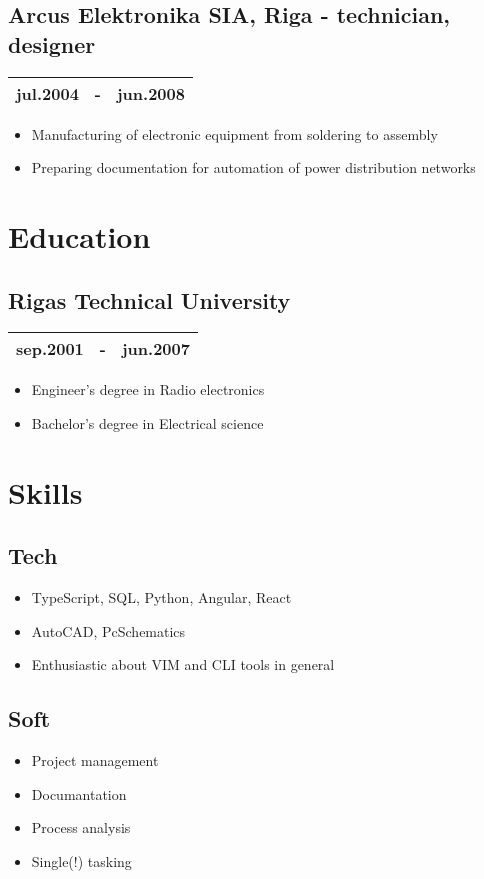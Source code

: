 \documentclass[10pt]{article}
\begin{document}
\begin{multicols*}{2}
\subsection*{Arcus Elektronika SIA, \textmd{Riga} - \textmd{technician, designer}}
\begin{tabular}{lll}
    jul.2004 & - & jun.2008\\
    \hline
\end{tabular}
\begin{itemize}
    \item Manufacturing of electronic equipment from soldering to assembly
    \item Preparing documentation for automation of power distribution networks
\end{itemize}
\section*{Education}
\subsection*{Rigas Technical University}
\begin{tabular}{lll}
    sep.2001 & - & jun.2007\\
    \hline
\end{tabular}
\begin{itemize}
    \item Engineer's degree in Radio electronics
    \item Bachelor's degree in Electrical science
\end{itemize}
\section*{Skills}
\subsection*{Tech}
\begin{itemize}
    \item TypeScript, SQL, Python, Angular, React
    \item AutoCAD, PcSchematics
    \item Enthusiastic about VIM and CLI tools in general
\end{itemize}
\subsection*{Soft}
\begin{itemize}
    \item Project management
    \item Documantation
    \item Process analysis 
    \item Single(!) tasking
\end{itemize}

\end{multicols*}
\end{document}
